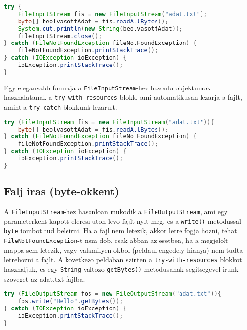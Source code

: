 \documentclass{article}
\let\l\lstinline
\begin{document}
\begin{lstlisting}[language=Java, caption=FileInputStream hasznalata]
try {
    FileInputStream fis = new FileInputStream("adat.txt");
    byte[] beolvasottAdat = fis.readAllBytes();
    System.out.println(new String(beolvasottAdat));
    fileInputStream.close();
} catch (FileNotFoundException fileNotFoundException) {
    fileNotFoundException.printStackTrace();
} catch (IOException ioException) {
    ioException.printStackTrace();
}
\end{lstlisting}

\newpage

Egy elegansabb formaja a \l{FileInputStream}-hez hasonlo objektumok hasznalatanak a \l{try-with-resources} blokk, ami automatikusan lezarja a fajlt, amint a \l{try-catch} blokkunk lezarult.

\begin{lstlisting}[language=Java, caption=Try-with-resources blokk hasznalata]
try (FileInputStream fis = new FileInputStream("adat.txt")){
    byte[] beolvasottAdat = fis.readAllBytes();
} catch (FileNotFoundException fileNotFoundException) {
    fileNotFoundException.printStackTrace();
} catch (IOException ioException) {
    ioException.printStackTrace();
}
\end{lstlisting}

\subsection{Falj iras (byte-okkent)}

A \l{FileInputStream}-hez hasonloan mukodik a \l{FileOutputStream}, ami egy parameterkent kapott eleresi uton levo fajlt nyit meg, es a \l{write()} metodussal \l{byte} tombot tud beleirni. Ha a fajl nem letezik, akkor letre fogja hozni, tehat \l{FileNotFoundException}-t nem dob, csak abban az esetben, ha a megjelolt mappa sem letezik, vagy valamilyen okbol (peldaul engedely hianya) nem tudta letrehozni a fajlt. A kovetkezo peldaban szinten a \l{try-with-resources} blokkot hasznaljuk, es egy \l{String} valtozo \l{getBytes()} metodusanak segitsegevel irunk szoveget az adat.txt fajlba.

\begin{lstlisting}[language=Java, caption=Fajlba iras FileOutputStream segitsegevel]
try (FileOutputStream fos = new FileOutputStream("adat.txt")){
    fos.write("Hello".getBytes());
} catch (IOException ioException) {
    ioException.printStackTrace();
}
\end{lstlisting}
\end{document}

